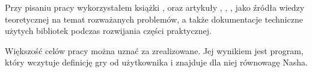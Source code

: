 \documentclass[polish]{standalone}
\begin{document}
Przy pisaniu pracy wykorzystałem książki \cite{FT-GT}, \cite{O-GT} oraz artykuły \cite{LH-NE}, \cite{PNS-NE},
\cite{SCG-NE}, \cite{SCARF-NR} jako źródła wiedzy teoretycznej na temat rozważanych problemów, a także dokumentacje
techniczne użytych bibliotek podczas rozwijania części praktycznej.

Większość celów pracy można uznać za zrealizowane. Jej wynikiem jest program, który wczytuje definicję gry od
użytkownika i znajduje dla niej równowagę Nasha.
\end{document}
